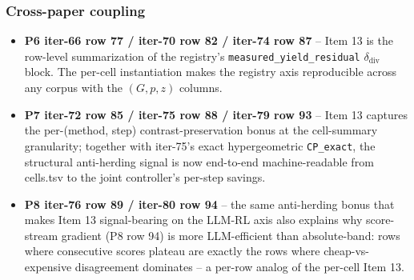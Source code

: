\subsubsection{Cross-paper coupling}
\begin{itemize}
  \item \textbf{P6 iter-66 row 77 / iter-70 row 82 / iter-74 row 87} --
        Item 13 is the row-level summarization of the registry's
        \texttt{measured\_yield\_residual} $\delta_{\mathrm{div}}$ block.
        The per-cell instantiation makes the registry axis reproducible
        across any corpus with the $(G, p, z)$ columns.
  \item \textbf{P7 iter-72 row 85 / iter-75 row 88 / iter-79 row 93} --
        Item 13 captures the per-(method, step) contrast-preservation bonus
        at the cell-summary granularity; together with iter-75's exact
        hypergeometric \texttt{CP\_exact}, the structural anti-herding signal
        is now end-to-end machine-readable from cells.tsv to the joint
        controller's per-step savings.
  \item \textbf{P8 iter-76 row 89 / iter-80 row 94} -- the same
        anti-herding bonus that makes Item 13 signal-bearing on the LLM-RL
        axis also explains why score-stream gradient (P8 row 94) is more
        LLM-efficient than absolute-band: rows where consecutive scores
        plateau are exactly the rows where cheap-vs-expensive disagreement
        dominates -- a per-row analog of the per-cell Item 13.
\end{itemize}

